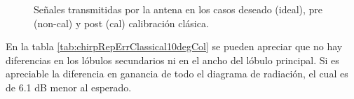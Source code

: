 \begin{figure}[H]
	\centering

	\caption{Señales transmitidas por la antena en los casos deseado (ideal), pre (non-cal) y post (cal) calibración clásica.}
	\label{fig:chirpRepErrClassical10degCol}
\end{figure}

En la tabla \ref{tab:chirpRepErrClassical10degCol} se pueden apreciar que no hay diferencias en los lóbulos secundarios ni en el
ancho del lóbulo principal. Si es apreciable la diferencia en ganancia de todo el diagrama de radiación, el cual es de 6.1 dB
menor al esperado.

